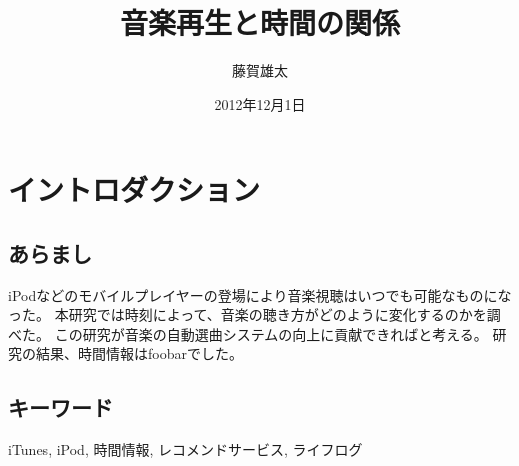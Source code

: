 \documentclass{jsarticle}
\begin{document}
\title{音楽再生と時間の関係}
\author{藤賀雄太}
\date{2012年12月1日}
\maketitle

\section{イントロダクション}
\subsection{あらまし}
iPodなどのモバイルプレイヤーの登場により音楽視聴はいつでも可能なものになった。
本研究では時刻によって、音楽の聴き方がどのように変化するのかを調べた。
この研究が音楽の自動選曲システムの向上に貢献できればと考える。
研究の結果、時間情報はfoobarでした。

\subsection{キーワード}
iTunes, iPod, 時間情報, レコメンドサービス, ライフログ
\end{document}
